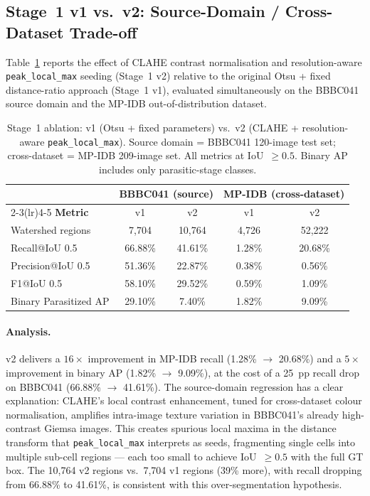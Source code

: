 \documentclass[review,12pt]{elsarticle}
\begin{document}
\subsection{Stage~1 v1 vs.\ v2: Source-Domain / Cross-Dataset Trade-off}
\label{ssec:stage1_v2_ablation}

Table~\ref{tab:stage1_ablation} reports the effect of CLAHE contrast
normalisation and resolution-aware \texttt{peak\_local\_max} seeding
(Stage~1 v2) relative to the original Otsu + fixed distance-ratio approach
(Stage~1 v1), evaluated simultaneously on the BBBC041 source domain and the
MP-IDB out-of-distribution dataset.

\begin{table}[H]
\centering
\small
\caption{Stage~1 ablation: v1 (Otsu + fixed parameters) vs.\ v2
  (CLAHE + resolution-aware \texttt{peak\_local\_max}). Source domain =
  BBBC041 120-image test set; cross-dataset = MP-IDB 209-image set.
  All metrics at IoU~$\geq 0.5$. Binary AP includes only parasitic-stage
  classes.}
\label{tab:stage1_ablation}
\renewcommand{\arraystretch}{1.2}
\begin{tabular}{lcccc}
\toprule
 & \multicolumn{2}{c}{\textbf{BBBC041 (source)}}
 & \multicolumn{2}{c}{\textbf{MP-IDB (cross-dataset)}} \\
\cmidrule(lr){2-3}\cmidrule(lr){4-5}
\textbf{Metric} & v1 & v2 & v1 & v2 \\
\midrule
Watershed regions   & 7,704  & 10,764  & 4,726   & 52,222 \\
Recall@IoU 0.5      & 66.88\% & 41.61\% & 1.28\%  & 20.68\% \\
Precision@IoU 0.5   & 51.36\% & 22.87\% & 0.38\%  & 0.56\% \\
F1@IoU 0.5          & 58.10\% & 29.52\% & 0.59\%  & 1.09\% \\
\midrule
Binary Parasitized AP & 29.10\% & 7.40\% & 1.82\%  & 9.09\% \\
\bottomrule
\end{tabular}
\end{table}

\paragraph{Analysis.}
v2 delivers a $16\times$ improvement in MP-IDB recall (1.28\%
$\rightarrow$ 20.68\%) and a $5\times$ improvement in binary AP
(1.82\% $\rightarrow$ 9.09\%), at the cost of a 25\ pp recall drop
on BBBC041 (66.88\% $\rightarrow$ 41.61\%). The source-domain regression
has a clear explanation: CLAHE's local contrast enhancement, tuned for
cross-dataset colour normalisation, amplifies intra-image texture variation
in BBBC041's already high-contrast Giemsa images. This creates spurious
local maxima in the distance transform that \texttt{peak\_local\_max}
interprets as seeds, fragmenting single cells into multiple sub-cell
regions --- each too small to achieve IoU~$\geq 0.5$ with the full GT box.
The 10,764 v2 regions vs.\ 7,704 v1 regions (39\% more), with recall
dropping from 66.88\% to 41.61\%, is consistent with this
over-segmentation hypothesis.
\end{document}
